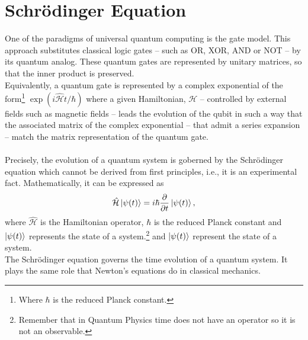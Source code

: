 \section{Schrödinger Equation}
One of the paradigms of universal quantum computing is the gate model. This approach substitutes classical logic gates -- such as OR, XOR, AND or NOT -- by its quantum analog. These quantum gates are represented by unitary matrices, so that the inner product is preserved.\\
Equivalently, a quantum gate is represented by a complex exponential of the form\footnote{Where $\hbar$ is the reduced Planck constant.} $\exp\left(i\hat{\mathcal{H}}t / \hbar\right)$ where a given Hamiltonian, $\mathcal{H}$ -- controlled by external fields such as magnetic fields -- leads the evolution of the qubit in such a way that the associated matrix of the complex exponential -- that admit a series expansion -- match the matrix representation of the quantum gate. \\\\
Precisely, the evolution of a quantum system is goberned by the Schrödinger equation which cannot be derived from first principles, i.e., it is an experimental fact. Mathematically, it can be expressed as
\begin{equation}
    \hat{\mathcal{H}}\ket{\psi(t)} = i\hbar \frac{\partial}{\partial t}\ket{\psi(t)},
\end{equation}
where $\hat{\mathcal{H}}$ is the Hamiltonian operator, $\hbar$ is the reduced Planck constant and $\ket{\psi(t)}$ represents the state of a system.\footnote{Remember that in Quantum Physics time does not have an operator so it is not an observable.} and $\ket{\psi(t)}$ represent the state of a system.\\
The Schrödinger equation governs the time evolution of a quantum system. It plays the same role that Newton's equations do in classical mechanics.
